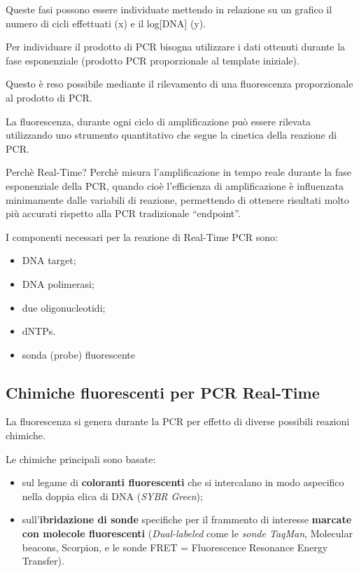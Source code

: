 \documentclass[11pt]{book}
\begin{document}
Queste fasi possono essere individuate mettendo in relazione su un
grafico il numero di cicli effettuati (x) e il log{[}DNA{]} (y).

Per individuare il prodotto di PCR bisogna utilizzare i dati ottenuti
durante la fase esponenziale (prodotto PCR proporzionale al template
iniziale).

Questo è reso possibile mediante il rilevamento di una fluorescenza
proporzionale al prodotto di PCR.

La fluorescenza, durante ogni ciclo di amplificazione può essere
rilevata utilizzando uno strumento quantitativo che segue la cinetica
della reazione di PCR.

Perchè Real-Time? Perchè misura l'amplificazione in tempo reale durante
la fase esponenziale della PCR, quando cioè l'efficienza di
amplificazione è influenzata minimamente dalle variabili di reazione,
permettendo di ottenere risultati molto più accurati rispetto alla PCR
tradizionale ``endpoint''.

I componenti necessari per la reazione di Real-Time PCR sono:

\begin{itemize}
\itemsep1pt\parskip0pt
\item
  DNA target;
\item
  DNA polimerasi;
\item
  due oligonucleotidi;
\item
  dNTPs.
\item
  sonda (probe) fluorescente
\end{itemize}

\subsection{Chimiche fluorescenti per PCR
Real-Time}\label{chimiche-fluorescenti-per-pcr-real-time}

La fluorescenza si genera durante la PCR per effetto di diverse
possibili reazioni chimiche.

Le chimiche principali sono basate:

\begin{itemize}
\itemsep1pt\parskip0pt
\item
  sul legame di \textbf{coloranti fluorescenti} che si intercalano in
  modo aspecifico nella doppia elica di DNA (\emph{SYBR Green});
\item
  sull'\textbf{ibridazione di sonde} specifiche per il frammento di
  interesse \textbf{marcate con molecole fluorescenti}
  (\emph{Dual-labeled} come le \emph{sonde TaqMan}, Molecular beacons,
  Scorpion, e le sonde FRET = Fluorescence Resonance Energy Transfer).
\end{itemize}
\end{document}
